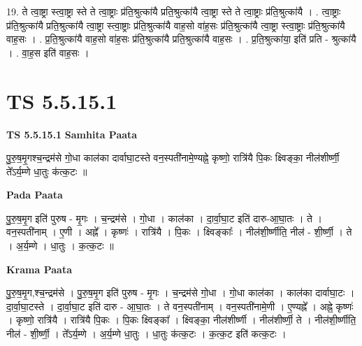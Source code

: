 \documentclass[17pt]{extarticle}
\begin{document}
19. ते त्वा॒ष्ट्रा स्त्वा॒ष्ट्रा स्ते ते त्वा॒ष्ट्राः प्र॑ति॒श्रुत्का॑यै प्रति॒श्रुत्का॑यै त्वा॒ष्ट्रा स्ते ते त्वा॒ष्ट्राः प्र॑ति॒श्रुत्का॑यै । . त्वा॒ष्ट्राः प्र॑ति॒श्रुत्का॑यै प्रति॒श्रुत्का॑यै त्वा॒ष्ट्रा स्त्वा॒ष्ट्राः प्र॑ति॒श्रुत्का॑यै वाह॒सो वा॑ह॒सः प्र॑ति॒श्रुत्का॑यै त्वा॒ष्ट्रा स्त्वा॒ष्ट्राः प्र॑ति॒श्रुत्का॑यै वाह॒सः । . प्र॒ति॒श्रुत्का॑यै वाह॒सो वा॑ह॒सः प्र॑ति॒श्रुत्का॑यै प्रति॒श्रुत्का॑यै वाह॒सः । . प्र॒ति॒श्रुत्का॑या॒ इति॑ प्रति - श्रुत्का॑यै । . वा॒ह॒स इति॑ वाह॒सः । \newline
\pagebreak
{}

\section{ TS 5.5.15.1 }

\textbf{TS 5.5.15.1 } \newline
\textbf{Samhita Paata} \newline

पु॒रु॒ष॒मृ॒गश्च॒न्द्रम॑से गो॒धा काल॑का दार्वाघा॒टस्ते वन॒स्पती॑नामे॒ण्यह्ने॒ कृष्णो॒ रात्रि॑यै पि॒कः क्ष्विङ्का॒ नील॑शीर्ष्णी॒ ते᳚ऽर्य॒म्णे धा॒तुः क॑त्क॒टः ॥ \newline

\textbf{Pada Paata} \newline

पु॒रु॒ष॒मृ॒ग इति॑ पुरुष - मृ॒गः । च॒न्द्रम॑से । गो॒धा । काल॑का । दा॒र्वा॒घा॒ट इति॑ दारु-आ॒घा॒तः । ते । वन॒स्पती॑नाम् । ए॒णी । अह्ने᳚ । कृष्णः॑ । रात्रि॑यै । पि॒कः । क्ष्विङ्काः᳚ । नील॑शी॒र्ष्णीति॒ नील॑ - शी॒र्ष्णी॒ । ते । अ॒र्य॒म्णे । धा॒तुः । क॒त्क॒टः ॥  \newline


\textbf{Krama Paata} \newline

पु॒रु॒ष॒मृ॒ग,श्च॒न्द्रम॑से । पु॒रु॒ष॒मृ॒ग इति॑ पुरुष - मृ॒गः । च॒न्द्रम॑से गो॒धा । गो॒धा काल॑का । काल॑का दार्वाघा॒टः । दा॒र्वा॒घा॒टस्ते । दा॒र्वा॒घा॒ट इति॑ दारु - आ॒घा॒तः । ते वन॒स्पती॑नाम् । वन॒स्पती॑नामे॒णी । ए॒ण्यह्ने᳚ । अह्ने॒ कृष्णः॑ । कृष्णो॒ रात्रि॑यै । रात्रि॑यै पि॒कः । पि॒कः क्ष्विङ्का᳚ । क्ष्विङ्का॒ नील॑शीर्ष्णी । नील॑शीर्ष्णी॒ ते । नील॑शी॒र्ष्णीति॒ नील॑ - शी॒र्ष्णी॒ । ते᳚ऽर्य॒म्णे । अ॒र्य॒म्णे धा॒तुः । धा॒तुः क॑त्क॒टः । क॒त्क॒ट इति॑ कत्क॒टः । \newline
\end{document}
